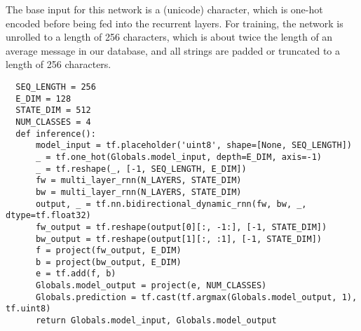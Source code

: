 \documentclass[10pt]{amsart}
\newcommand{\x}{\mathbf{x}}
\theoremstyle{definition}
\begin{document}


The base input for this network is a (unicode) character, which is one-hot encoded before being fed into the
 recurrent layers.  For training, the network is unrolled to a length of 256 characters,
 which is about twice the length  of an average message in our database, and all strings are padded or truncated
 to a length of 256 characters.


\begin{verbatim}
  SEQ_LENGTH = 256
  E_DIM = 128
  STATE_DIM = 512
  NUM_CLASSES = 4
  def inference():
      model_input = tf.placeholder('uint8', shape=[None, SEQ_LENGTH])
      _ = tf.one_hot(Globals.model_input, depth=E_DIM, axis=-1)
      _ = tf.reshape(_, [-1, SEQ_LENGTH, E_DIM])
      fw = multi_layer_rnn(N_LAYERS, STATE_DIM)
      bw = multi_layer_rnn(N_LAYERS, STATE_DIM)
      output, _ = tf.nn.bidirectional_dynamic_rnn(fw, bw, _, dtype=tf.float32)
      fw_output = tf.reshape(output[0][:, -1:], [-1, STATE_DIM])
      bw_output = tf.reshape(output[1][:, :1], [-1, STATE_DIM])
      f = project(fw_output, E_DIM)
      b = project(bw_output, E_DIM)
      e = tf.add(f, b)
      Globals.model_output = project(e, NUM_CLASSES)
      Globals.prediction = tf.cast(tf.argmax(Globals.model_output, 1), tf.uint8)
      return Globals.model_input, Globals.model_output
\end{verbatim}
\end{document}
